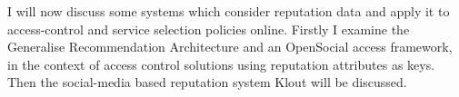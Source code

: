 I will now discuss some systems which consider reputation data and apply it to access-control and service selection policies online. Firstly I examine the Generalise Recommendation Architecture and an OpenSocial access framework, in the context of access control solutions using reputation attributes as keys. Then the social-media based reputation system Klout will be discussed. 


% 
% 
% 
% 
% 

